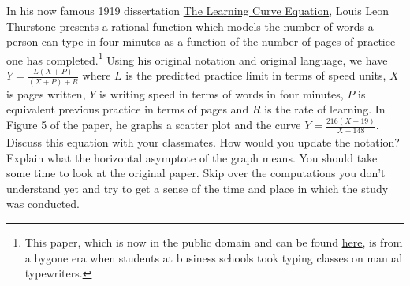 \documentclass{ximera}
\begin{document}
\begin{problem}
  In his now famous 1919 dissertation \underline{The Learning Curve Equation}, Louis Leon Thurstone presents a rational function which models the number of words a person can type in four minutes as a function of the number of pages of practice one has completed.\footnote{This paper, which is now in the public domain and can be found  \href{http://bit.ly/2uNaUBa}{\underline{here}}, is from a bygone era when students at business schools took typing classes on manual typewriters.} Using his original notation and original language, we have $Y = \frac{L(X + P)}{(X + P) + R}$ where $L$ is the predicted practice limit in terms of speed units, $X$ is pages written, $Y$ is writing speed in terms of words in four minutes, $P$ is equivalent previous practice in terms of pages and $R$ is the rate of learning. In Figure 5 of the paper, he graphs a scatter plot and the curve $Y = \frac{216(X + 19)}{X + 148}$.  Discuss this equation with your classmates.  How would you update the notation?  Explain what the horizontal asymptote of the graph means.  You should take some time to look at the original paper. Skip over the computations you don't understand yet and try to get a sense of the time and place in which the study was conducted.
\end{problem}
\end{document}
